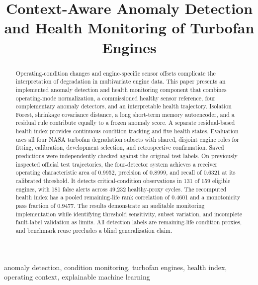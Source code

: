 \documentclass[conference]{IEEEtran}
\begin{document}
\title{Context-Aware Anomaly Detection and Health Monitoring of Turbofan Engines}
\author{
}
\maketitle

\begin{abstract}
Operating-condition changes and engine-specific sensor offsets complicate the interpretation of degradation in multivariate engine data. This paper presents an implemented anomaly detection and health monitoring component that combines operating-mode normalization, a commissioned healthy sensor reference, four complementary anomaly detectors, and an interpretable health trajectory. Isolation Forest, shrinkage covariance distance, a long short-term memory autoencoder, and a residual rule contribute equally to a frozen anomaly score. A separate residual-based health index provides continuous condition tracking and five health states. Evaluation uses all four NASA turbofan degradation subsets with shared, disjoint engine roles for fitting, calibration, development selection, and retrospective confirmation. Saved predictions were independently checked against the original test labels. On previously inspected official test trajectories, the four-detector system achieves a receiver operating characteristic area of 0.9952, precision of 0.8999, and recall of 0.6321 at its calibrated threshold. It detects critical-condition observations in 131 of 159 eligible engines, with 181 false alerts across 49,232 healthy-proxy cycles. The recomputed health index has a pooled remaining-life rank correlation of 0.4601 and a monotonicity pass fraction of 0.9477. The results demonstrate an auditable monitoring implementation while identifying threshold sensitivity, subset variation, and incomplete fault-label validation as limits. All detection labels are remaining-life condition proxies, and benchmark reuse precludes a blind generalization claim.
\end{abstract}

\begin{IEEEkeywords}
anomaly detection, condition monitoring, turbofan engines, health index, operating context, explainable machine learning
\end{IEEEkeywords}
\end{document}
